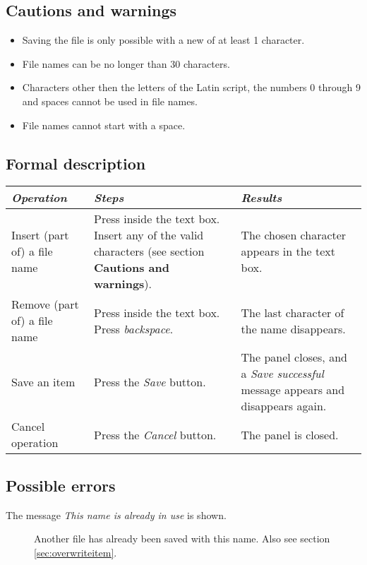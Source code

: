   \subsection*{Cautions and warnings}
  \begin{itemize}
  \item Saving the file is only possible with a new of at least 1 character.
  \item File names can be no longer than 30 characters.
  \item Characters other then the letters of the Latin script, the numbers 0 through 9 and spaces cannot be used in file names.
  \item File names cannot start with a space.
  \end{itemize}

  \subsection*{Formal description}
    \begin{tabularx}{\textwidth}{XXX}
    \toprule
    \emph{Operation} & \emph{Steps} & \emph{Results} \\
    \midrule
    Insert (part of) a file name & Press inside the text box. Insert any of the valid characters (see section \textbf{Cautions and warnings}). & The chosen character appears in the text box. \\
    \midrule
    Remove (part of) a file name & Press inside the text box. Press \emph{backspace}. & The last character of the name disappears. \\
    \midrule
    Save an item & Press the \emph{Save} button. & The panel closes, and a \emph{Save successful} message appears and disappears again. \\
    \midrule
    Cancel operation & Press the \emph{Cancel} button. & The panel is closed. \\
    \bottomrule
\end{tabularx}

  \subsection*{Possible errors}
  \begin{description}
  \item[The message \emph{This name is already in use} is shown.] Another file has already been saved with this name. Also see section \ref{sec:overwriteitem}.
  \end{description}

